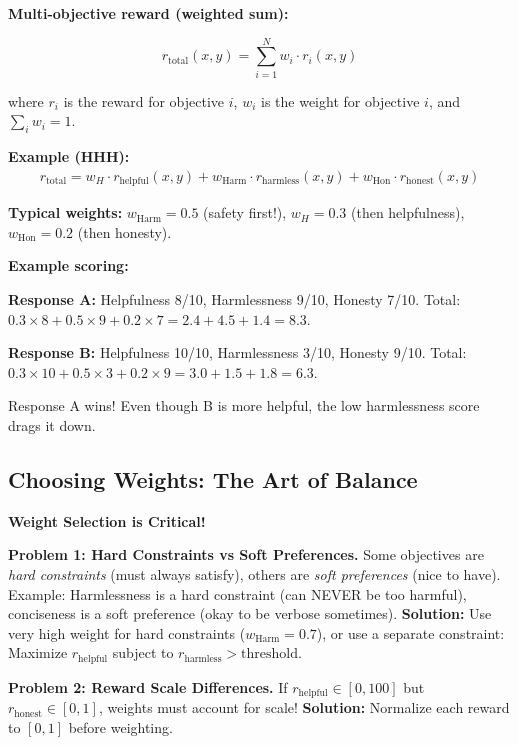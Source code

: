 \begin{chapterenv}
\begin{infobox}
\textbf{Multi-objective reward (weighted sum):}

$$r_{\text{total}}(x, y) = \sum_{i=1}^N w_i \cdot r_i(x, y)$$

where $r_i$ is the reward for objective $i$, $w_i$ is the weight for objective $i$, and $\sum_i w_i = 1$.

\textbf{Example (HHH):}
\begin{align*}
r_{\text{total}} = w_H \cdot r_{\text{helpful}}(x, y) + w_{\text{Harm}} \cdot r_{\text{harmless}}(x, y) + w_{\text{Hon}} \cdot r_{\text{honest}}(x, y)
\end{align*}

\textbf{Typical weights:} $w_{\text{Harm}} = 0.5$ (safety first!), $w_H = 0.3$ (then helpfulness), $w_{\text{Hon}} = 0.2$ (then honesty).

\textbf{Example scoring:}

\textbf{Response A:} Helpfulness 8/10, Harmlessness 9/10, Honesty 7/10. Total: $0.3 \times 8 + 0.5 \times 9 + 0.2 \times 7 = 2.4 + 4.5 + 1.4 = 8.3$.

\textbf{Response B:} Helpfulness 10/10, Harmlessness 3/10, Honesty 9/10. Total: $0.3 \times 10 + 0.5 \times 3 + 0.2 \times 9 = 3.0 + 1.5 + 1.8 = 6.3$.

Response A wins! Even though B is more helpful, the low harmlessness score drags it down.
\end{infobox}

\subsection{Choosing Weights: The Art of Balance}

\begin{tipbox}
\textbf{Weight Selection is Critical!}

\textbf{Problem 1: Hard Constraints vs Soft Preferences.} Some objectives are \textit{hard constraints} (must always satisfy), others are \textit{soft preferences} (nice to have). Example: Harmlessness is a hard constraint (can NEVER be too harmful), conciseness is a soft preference (okay to be verbose sometimes). \textbf{Solution:} Use very high weight for hard constraints ($w_{\text{Harm}} = 0.7$), or use a separate constraint: Maximize $r_{\text{helpful}}$ subject to $r_{\text{harmless}} > \text{threshold}$.

\textbf{Problem 2: Reward Scale Differences.} If $r_{\text{helpful}} \in [0, 100]$ but $r_{\text{honest}} \in [0, 1]$, weights must account for scale! \textbf{Solution:} Normalize each reward to $[0, 1]$ before weighting.
\end{tipbox}


\end{chapterenv}
